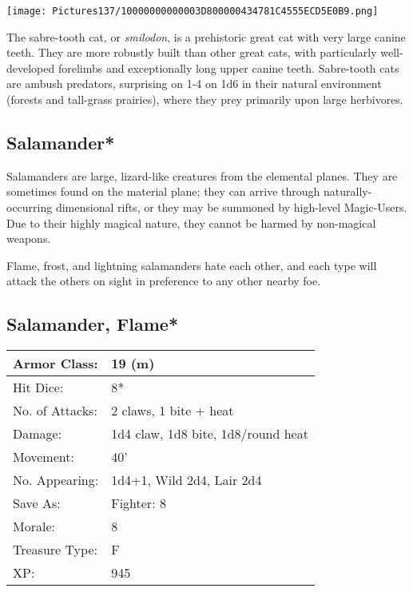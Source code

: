 \documentclass[a4paper,twoside,openany,10pt]{book}
\begin{document}
\begin{multicols}{2}
\begin{center} \texttt{[image: Pictures137/10000000000003D800000434781C4555ECD5E0B9.png]} \end{center}

The sabre-tooth cat, or \emph{smilodon}, is a prehistoric great cat with very large canine teeth. They are more robustly built than other great cats, with particularly well-developed forelimbs and exceptionally long upper canine teeth. Sabre-tooth cats are ambush predators, surprising on 1‑4 on 1d6 in their natural environment (forests and tall-grass prairies), where they prey primarily upon large herbivores.


\subsection*{Salamander*}\label{salamander}

Salamanders are large, lizard-like creatures from the elemental planes. They are sometimes found on the material plane; they can arrive through naturally-occurring dimensional rifts, or they may be summoned by high-level Magic-Users. Due to their highly magical nature, they cannot be harmed by non-magical weapons.

Flame, frost, and lightning salamanders hate each other, and each type will attack the others on sight in preference to any other nearby foe.

\subsection*{Salamander, Flame*}\label{salamander-flame}

\begin{tabularx}{0.50\textwidth}{@{}lX@{}}
Armor Class: & 19 (m) \\\hline
Hit Dice: & 8* \\\hline
No. of Attacks: & 2 claws, 1 bite + heat \\\hline
Damage: & 1d4 claw, 1d8 bite, 1d8/round heat \\\hline
Movement: & 40' \\\hline
No. Appearing: & 1d4+1, Wild 2d4, Lair 2d4 \\\hline
Save As: & Fighter: 8 \\\hline
Morale: & 8 \\\hline
Treasure Type: & F \\\hline
XP: & 945 \\\hline
\end{tabularx}\medskip



\end{multicols}
\end{document}
